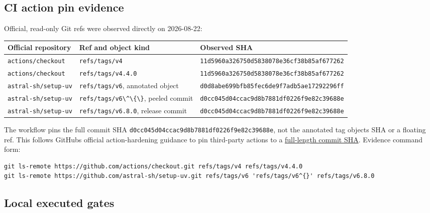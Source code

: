 \documentclass[
  letterpaper,
]{article}
\newcommand{\passthrough}[1]{#1}
\newcounter{none} %
\begin{document}
\subsection{CI action pin evidence}\label{ci-action-pin-evidence}

Official, read-only Git refs were observed directly on 2026-08-22:

{\def\LTcaptype{none} %
\begin{longtable}[]{@{}lll@{}}
\toprule\noalign{}
Official repository & Ref and object kind & Observed SHA \\
\midrule\noalign{}
\endhead
\bottomrule\noalign{}
\endlastfoot
\nolinkurl{actions/checkout} & \nolinkurl{refs/tags/v4} & \nolinkurl{11d5960a326750d5838078e36cf38b85af677262} \\
\nolinkurl{actions/checkout} & \nolinkurl{refs/tags/v4.4.0} & \nolinkurl{11d5960a326750d5838078e36cf38b85af677262} \\
\nolinkurl{astral-sh/setup-uv} & \nolinkurl{refs/tags/v6}, annotated object &
\nolinkurl{d0d8abe699bfb85fec6de9f7adb5ae17292296ff} \\
\nolinkurl{astral-sh/setup-uv} & \passthrough{\lstinline!refs/tags/v6\^\{\}!}, peeled commit &
\nolinkurl{d0cc045d04ccac9d8b7881df0226f9e82c39688e} \\
\nolinkurl{astral-sh/setup-uv} & \nolinkurl{refs/tags/v6.8.0}, release commit &
\nolinkurl{d0cc045d04ccac9d8b7881df0226f9e82c39688e} \\
\end{longtable}
}

The workflow pins the full commit SHA \nolinkurl{d0cc045d04ccac9d8b7881df0226f9e82c39688e}, not the annotated tag
object\textquotesingle s SHA or a floating ref. This follows GitHub\textquotesingle s official action-hardening guidance
to pin third-party actions to a
\href{https://docs.github.com/actions/security-guides/security-hardening-for-github-actions}{full-length commit SHA}.
Evidence command form:

\begin{lstlisting}
git ls-remote https://github.com/actions/checkout.git refs/tags/v4 refs/tags/v4.4.0
git ls-remote https://github.com/astral-sh/setup-uv.git refs/tags/v6 'refs/tags/v6^{}' refs/tags/v6.8.0
\end{lstlisting}

\subsection{Local executed gates}\label{local-executed-gates}
\end{document}
